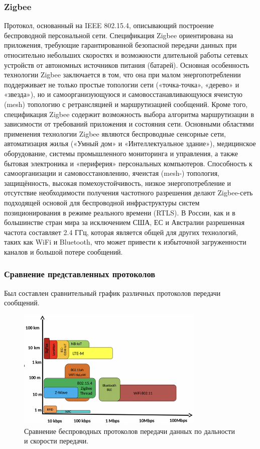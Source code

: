 \documentclass[a4paper,12pt]{article}
\begin{document}
\subsubsection{Zigbee}
Протокол, основанный на IEEE 802.15.4, описывающий построение беспроводной персональной сети. Спецификация Zigbee ориентирована на приложения, требующие гарантированной безопасной передачи данных при относительно небольших скоростях и возможности длительной работы сетевых устройств от автономных источников питания (батарей). Основная особенность технологии Zigbee заключается в том, что она при малом энергопотреблении поддерживает не только простые топологии сети («точка-точка», «дерево» и «звезда»), но и самоорганизующуюся и самовосстанавливающуюся ячеистую (mesh) топологию с ретрансляцией и маршрутизацией сообщений. Кроме того, спецификация Zigbee содержит возможность выбора алгоритма маршрутизации в зависимости от требований приложения и состояния сети.
Основными областями применения технологии Zigbee являются беспроводные сенсорные сети, автоматизация жилья («Умный дом» и «Интеллектуальное здание»), медицинское оборудование, системы промышленного мониторинга и управления, а также бытовая электроника и «периферия» персональных компьютеров.
Способность к самоорганизации и самовосстановлению, ячеистая (mesh-) топология, защищённость, высокая помехоустойчивость, низкое энергопотребление и отсутствие необходимости получения частотного разрешения делают Zigbee-сеть подходящей основой для беспроводной инфраструктуры систем позиционирования в режиме реального времени (RTLS).
В России, как и в большинстве стран мира за исключением США, ЕС и Австралии разрешенная частота составляет 2.4 ГГц, которая является общей для других технологий, таких как WiFi и Bluetooth, что может привести к избыточной загруженности каналов и большой потере сообщений.

\subsubsection{Сравнение представленных протоколов}
Был составлен сравнительный график различных протоколов передачи сообщений.\

\begin{figure}[h]
    \centering
    \includegraphics[width=0.8\textwidth]{images/Fig07.png}
    \caption{Сравнение беспроводных протоколов передачи данных по дальности и скорости передачи. \cite{IMG_protocol_compare} }
    \label{fig:protocols_range_vs_speed}
\end{figure}
\end{document}
